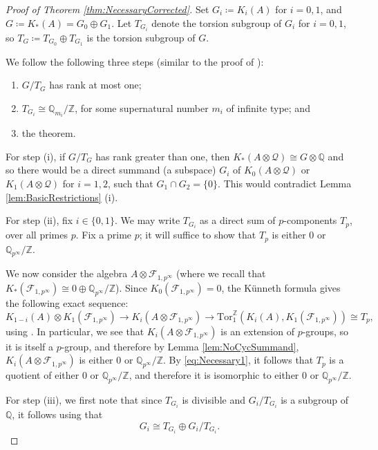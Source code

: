 \documentclass[a4paper,10pt]{amsart}
\newcounter{theorem}
\numberwithin{equation}{section}
\numberwithin{theorem}{section}
\newcommand{\Q}{\mathbb{Q}}
\newcommand{\Z}{\mathbb{Z}}
\newcommand{\Tor}{\mathrm{Tor}_1^{\Z}}
\begin{document}
\begin{proof}[Proof of Theorem \ref{thm:NecessaryCorrected}]
Set $G_i \coloneqq K_i(A)$ for $i=0,1$, and $G \coloneqq K_*(A)=G_0\oplus G_1$.
Let $T_{G_i}$ denote the torsion subgroup of $G_i$ for $i=0,1$, so $T_G \coloneqq T_{G_0}\oplus T_{G_1}$ is the torsion subgroup of $G$.

We follow the following three steps (similar to the proof of \cite[Theorem 6.1]{aifK}):
\begin{enumerate}
\item $G/T_G$ has rank at most one;
\item $T_{G_i} \cong \Q_{m_i}/\Z$, for some supernatural number $m_i$ of infinite type; and
\item the theorem.
\end{enumerate}

For step (i), if $G/T_G$ has rank greater than one, then $K_*(A\otimes \mathcal Q) \cong G\otimes \Q$ and so there would be a direct summand (a subspace) $G_i$ of $K_0(A\otimes \mathcal Q)$ or $K_1(A\otimes \mathcal Q)$ for $i=1,2$, such that $G_1 \cap G_2 = \{0\}$.
This would contradict Lemma \ref{lem:BasicRestrictions} (i).

For step (ii), fix $i\in\{0,1\}$.
We may write $T_{G_i}$ as a direct sum of $p$-components $T_p$, over all primes $p$.
Fix a prime $p$; it will suffice to show that $T_p$ is either $0$ or $\Q_{p^\infty}/\Z$.

We now consider the algebra $A \otimes \mathcal F_{1,p^\infty}$ (where we recall that $K_*(\mathcal F_{1,p^\infty}) \cong 0 \oplus \Q_{p^\infty}/\Z$).
Since $K_0(\mathcal F_{1,p^\infty})=0$, the K\"unneth formula gives the following exact sequence:
\begin{equation}
\label{eq:Necessary1}
K_{1-i}(A)\otimes K_1(\mathcal F_{1,p^\infty}) \to K_i(A\otimes \mathcal F_{1,p^\infty}) \to \Tor(K_i(A),K_1(\mathcal F_{1,p^\infty}))\cong T_p,
\end{equation}
using \cite[62.J]{Fuchs}.
In particular, we see that $K_i(A\otimes \mathcal F_{1,p^\infty})$ is an extension of $p$-groups, so it is itself a $p$-group, and therefore by Lemma \ref{lem:NoCycSummand}, $K_i(A\otimes \mathcal F_{1,p^\infty})$ is either $0$ or $\Q_{p^\infty}/\Z$.
By \eqref{eq:Necessary1}, it follows that $T_p$ is a quotient of either $0$ or $\Q_{p^\infty}/\Z$, and therefore it is isomorphic to either $0$ or $\Q_{p^\infty}/\Z$.

For step (iii), we first note that since $T_{G_i}$ is divisible and $G_i/T_{G_i}$ is a subgroup of $\Q$, it follows using \cite[Lemma 1.1]{aifK} that
\[ G_i \cong T_{G_i} \oplus G_i/T_{G_i}. \]


\end{proof}
\end{document}
